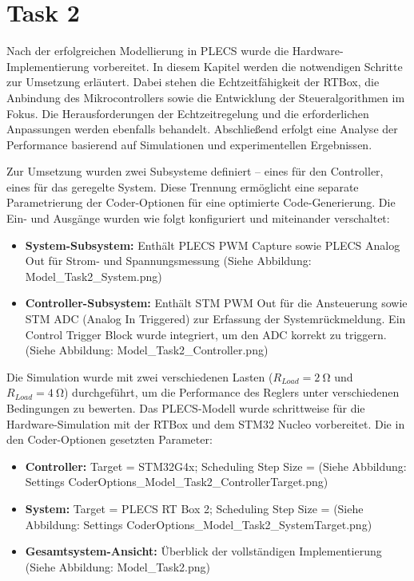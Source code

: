 \section{Task 2} \label{sec:Task2}

Nach der erfolgreichen Modellierung in PLECS wurde die Hardware-Implementierung vorbereitet. In diesem Kapitel werden die notwendigen Schritte zur Umsetzung erläutert. Dabei stehen die Echtzeitfähigkeit der RTBox, die Anbindung des Mikrocontrollers sowie die Entwicklung der Steueralgorithmen im Fokus. Die Herausforderungen der Echtzeitregelung und die erforderlichen Anpassungen werden ebenfalls behandelt. Abschließend erfolgt eine Analyse der Performance basierend auf Simulationen und experimentellen Ergebnissen.

Zur Umsetzung wurden zwei Subsysteme definiert – eines für den Controller, eines für das geregelte System. Diese Trennung ermöglicht eine separate Parametrierung der Coder-Optionen für eine optimierte Code-Generierung. Die Ein- und Ausgänge wurden wie folgt konfiguriert und miteinander verschaltet:

\begin{itemize}
    \item \textbf{System-Subsystem:} Enthält PLECS PWM Capture sowie PLECS Analog Out für Strom- und Spannungsmessung (Siehe Abbildung: Model_Task2_System.png)
 
    \item \textbf{Controller-Subsystem:} Enthält STM PWM Out für die Ansteuerung sowie STM ADC (Analog In Triggered) zur Erfassung der Systemrückmeldung. Ein Control Trigger Block wurde integriert, um den ADC korrekt zu triggern. (Siehe Abbildung: Model_Task2_Controller.png)
\end{itemize}

Die Simulation wurde mit zwei verschiedenen Lasten ($R_{Load}=\SI{2}{\ohm}$ und $R_{Load}=\SI{4}{\ohm}$) durchgeführt, um die Performance des Reglers unter verschiedenen Bedingungen zu bewerten. Das PLECS-Modell wurde schrittweise für die Hardware-Simulation mit der RTBox und dem STM32 Nucleo vorbereitet. Die in den Coder-Optionen gesetzten Parameter:

\begin{itemize}
    \item \textbf{Controller:} Target = STM32G4x; Scheduling Step Size = (Siehe Abbildung: Settings CoderOptions_Model_Task2_ControllerTarget.png)

    \item \textbf{System:} Target = PLECS RT Box 2; Scheduling Step Size =  (Siehe Abbildung: Settings CoderOptions_Model_Task2_SystemTarget.png)

    \item \textbf{Gesamtsystem-Ansicht:} Überblick der vollständigen Implementierung (Siehe Abbildung: Model_Task2.png)
\end{itemize}

